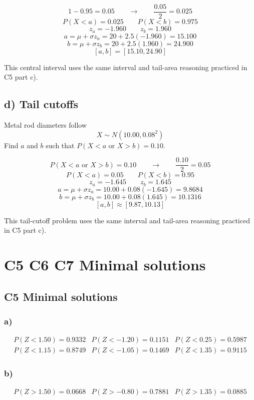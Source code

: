 	\[
	1-0.95=0.05
	\qquad \longrightarrow \qquad
	\frac{0.05}{2}=0.025
	\]
	\[
	P(X<a)=0.025
	\qquad
	P(X<b)=0.975
	\]
	\[
	z_a=-1.960
	\qquad
	z_b=1.960
	\]
	\[
	a=\mu+\sigma z_a
	=20+2.5(-1.960)
	=15.100
	\]
	\[
	b=\mu+\sigma z_b
	=20+2.5(1.960)
	=24.900
	\]
	\[
	[a,b]=[15.10,24.90]
	\]
	
	This central interval uses the same interval and tail-area reasoning practiced in C5 part c).
	
	
	\subsection*{d) Tail cutoffs}
	\label{subsec:inverse-normal-problems-c7-d}
	Metal rod diameters follow
	\[
	X\sim N(10.00,0.08^2)
	\]
	Find \(a\) and \(b\) such that \(P(X<a\text{ or }X>b)=0.10\).
	
	\[
	P(X<a\text{ or }X>b)=0.10
	\qquad \longrightarrow \qquad
	\frac{0.10}{2}=0.05
	\]
	\[
	P(X<a)=0.05
	\qquad
	P(X<b)=0.95
	\]
	\[
	z_a=-1.645
	\qquad
	z_b=1.645
	\]
	\[
	a=\mu+\sigma z_a
	=10.00+0.08(-1.645)
	=9.8684
	\]
	\[
	b=\mu+\sigma z_b
	=10.00+0.08(1.645)
	=10.1316
	\]
	\[
	[a,b]\approx[9.87,10.13]
	\]
	
	This tail-cutoff problem uses the same interval and tail-area reasoning practiced in C5 part c).
	
	

	\section{C5 C6 C7 Minimal solutions}
	
	\subsection{C5 Minimal solutions}
	
	\subsubsection*{a)}
	\[
	\begin{array}{lll}
		P(Z<1.50)=0.9332
		&
		P(Z<-1.20)=0.1151
		&
		P(Z<0.25)=0.5987
		\\[0.2cm]
		P(Z<1.15)=0.8749
		&
		P(Z<-1.05)=0.1469
		&
		P(Z<1.35)=0.9115
	\end{array}
	\]
	
	\subsubsection*{b)}
	\[
	\begin{array}{lll}
		P(Z>1.50)=0.0668
		&
		P(Z>-0.80)=0.7881
		&
		P(Z>1.35)=0.0885
	\end{array}
	\]
	
